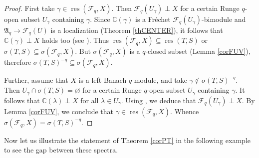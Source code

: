 \documentclass[12pt,reqno]{amsart}%
\theoremstyle{plain}
\numberwithin{theorem}{section} \numberwithin{equation}{section}
\numberwithin{lemma}{section}
\numberwithin{remark}{section}
\numberwithin{example}{section}
\numberwithin{proposition}{section}
\numberwithin{definition}{section}
\numberwithin{corollary}{section}
\begin{document}
\begin{proof}
First take $\gamma\in\operatorname*{res}\left(  \mathcal{F}_{q},X\right)  $.
Then $\mathcal{F}_{q}\left(  U_{\gamma}\right)  \perp X$ for a certain Runge
$q$-open subset $U_{\gamma}$ containing $\gamma$. Since $\mathbb{C}\left(
\gamma\right)  $ is a Fr\'{e}chet $\mathcal{F}_{q}\left(  U_{\gamma}\right)
$-bimodule and $\mathfrak{A}_{q}\rightarrow\mathcal{F}_{q}\left(  U\right)  $
is a localization (Theorem \ref{thCENTER}), it follows that $\mathbb{C}\left(
\gamma\right)  \perp X$ holds too (see \cite[Proposition 2.7 (b)]{Tay2}). Thus
$\operatorname*{res}\left(  \mathcal{F}_{q},X\right)  \subseteq
\operatorname{res}\left(  T,S\right)  $ or $\sigma\left(  T,S\right)
\subseteq\sigma\left(  \mathcal{F}_{q},X\right)  $. But $\sigma\left(
\mathcal{F}_{q},X\right)  $ is a $q$-closed subset (Lemma \ref{corFUV}),
therefore $\sigma\left(  T,S\right)  ^{-q}\subseteq\sigma\left(
\mathcal{F}_{q},X\right)  $.

Further, assume that $X$ is a left Banach $q$-module, and take $\gamma
\notin\sigma\left(  T,S\right)  ^{-q}$. Then $U_{\gamma}\cap\sigma\left(
T,S\right)  =\varnothing$ for a certain Runge $q$-open subset $U_{\gamma}$
containing $\gamma$. It follows that $\mathbb{C}\left(  \lambda\right)  \perp
X$ for all $\lambda\in U_{\gamma}$. Using \cite[Theorem 6.2]{Dosi25}, we
deduce that $\mathcal{F}_{q}\left(  U_{\gamma}\right)  \perp X$. By Lemma
\ref{corFUV}, we conclude that $\gamma\in\operatorname*{res}\left(
\mathcal{F}_{q},X\right)  $. Whence $\sigma\left(  \mathcal{F}_{q},X\right)
=\sigma\left(  T,S\right)  ^{-q}$.
\end{proof}

Now let us illustrate the statement of Theorem \ref{corPT} in the following
example to see the gap between these spectra.
\end{document}
